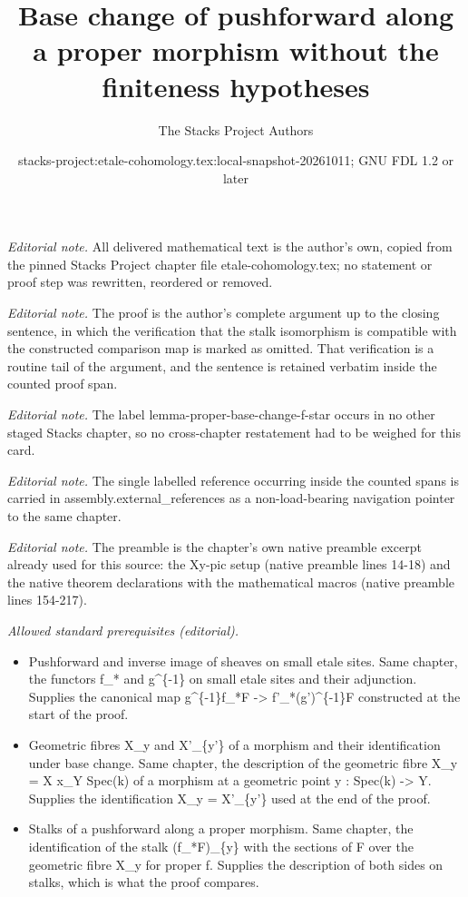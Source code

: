 \documentclass[10pt,a4paper]{amsart}
\title{Base change of pushforward along a proper morphism without the finiteness hypotheses}
\author{The Stacks Project Authors}
\date{stacks-project:etale-cohomology.tex:local-snapshot-20261011; GNU FDL 1.2 or later}
\theoremstyle{plain}
\theoremstyle{definition}
\theoremstyle{remark}
\numberwithin{equation}{subsection}
\begin{document}
\maketitle
\noindent\textit{Editorial note.} All delivered mathematical text is the author's own, copied from the pinned Stacks Project chapter file etale-cohomology.tex; no statement or proof step was rewritten, reordered or removed.\par\medskip
\noindent\textit{Editorial note.} The proof is the author's complete argument up to the closing sentence, in which the verification that the stalk isomorphism is compatible with the constructed comparison map is marked as omitted. That verification is a routine tail of the argument, and the sentence is retained verbatim inside the counted proof span.\par\medskip
\noindent\textit{Editorial note.} The label lemma-proper-base-change-f-star occurs in no other staged Stacks chapter, so no cross-chapter restatement had to be weighed for this card.\par\medskip
\noindent\textit{Editorial note.} The single labelled reference occurring inside the counted spans is carried in assembly.external\_references as a non-load-bearing navigation pointer to the same chapter.\par\medskip
\noindent\textit{Editorial note.} The preamble is the chapter's own native preamble excerpt already used for this source: the Xy-pic setup (native preamble lines 14-18) and the native theorem declarations with the mathematical macros (native preamble lines 154-217).\par\medskip
\noindent\textit{Allowed standard prerequisites (editorial).}\begin{itemize}
\item Pushforward and inverse image of sheaves on small etale sites. Same chapter, the functors f\_* and g\textasciicircum{}\{-1\} on small etale sites and their adjunction. Supplies the canonical map g\textasciicircum{}\{-1\}f\_*F -> f'\_*(g')\textasciicircum{}\{-1\}F constructed at the start of the proof.
\item Geometric fibres X\_y and X'\_\{y'\} of a morphism and their identification under base change. Same chapter, the description of the geometric fibre X\_y = X x\_Y Spec(k) of a morphism at a geometric point y : Spec(k) -> Y. Supplies the identification X\_y = X'\_\{y'\} used at the end of the proof.
\item Stalks of a pushforward along a proper morphism. Same chapter, the identification of the stalk (f\_*F)\_\{y\} with the sections of F over the geometric fibre X\_y for proper f. Supplies the description of both sides on stalks, which is what the proof compares.
\end{itemize}\medskip
\end{document}
